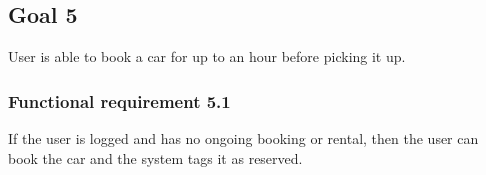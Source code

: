 \subsection{Goal 5}
User is able to book a car for up to an hour before picking it up.

\setcounter{secnumdepth}{3}
\subsubsection{Functional requirement 5.1}
If the user is logged and has no ongoing booking or rental, then the user can book the car and the system tags it as reserved.